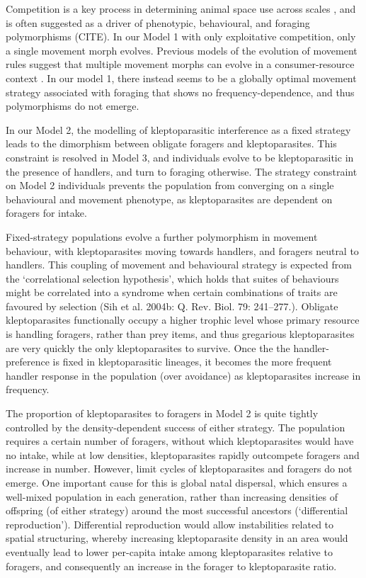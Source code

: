 \documentclass[11pt]{article}
\begin{document}
Competition is a key process in determining animal space use across scales \cite{fretwell1970, meer1997}, and is often suggested as a driver of phenotypic, behavioural, and foraging polymorphisms (CITE).
In our Model 1 with only exploitative competition, only a single movement morph evolves.
Previous models of the evolution of movement rules suggest that multiple movement morphs can evolve in a consumer-resource context \citep[][Netz et al. in prep.]{getz2015}.
In our model 1, there instead seems to be a globally optimal movement strategy associated with foraging that shows no frequency-dependence, and thus polymorphisms do not emerge.

In our Model 2, the modelling of kleptoparasitic interference as a fixed strategy leads to the dimorphism between obligate foragers and kleptoparasites.
This constraint is resolved in Model 3, and individuals evolve to be kleptoparasitic in the presence of handlers, and turn to foraging otherwise.
The strategy constraint on Model 2 individuals prevents the population from converging on a single behavioural and movement phenotype, as kleptoparasites are dependent on foragers for intake.

Fixed-strategy populations evolve a further polymorphism in movement behaviour, with kleptoparasites moving towards handlers, and foragers neutral to handlers.
This coupling of movement and behavioural strategy is expected from the `correlational selection hypothesis', which holds that suites of behaviours might be correlated into a syndrome when certain combinations of traits are favoured by selection (Sih et al. 2004b: Q. Rev. Biol. 79: 241–277.).
Obligate kleptoparasites functionally occupy a higher trophic level whose primary resource is handling foragers, rather than prey items, and thus gregarious kleptoparasites are very quickly the only kleptoparasites to survive.
Once the the handler-preference is fixed in kleptoparasitic lineages, it becomes the more frequent handler response in the population (over avoidance) as kleptoparasites increase in frequency.

The proportion of kleptoparasites to foragers in Model 2 is quite tightly controlled by the density-dependent success of either strategy.
The population requires a certain number of foragers, without which kleptoparasites would have no intake, while at low densities, kleptoparasites rapidly outcompete foragers and increase in number.
However, limit cycles of kleptoparasites and foragers do not emerge.
One important cause for this is global natal dispersal, which ensures a well-mixed population in each generation, rather than increasing densities of offspring (of either strategy) around the most successful ancestors (`differential reproduction').
Differential reproduction would allow instabilities related to spatial structuring, whereby increasing  kleptoparasite density in an area would eventually lead to lower per-capita intake among kleptoparasites relative to foragers, and consequently an increase in the forager to kleptoparasite ratio.
\end{document}
